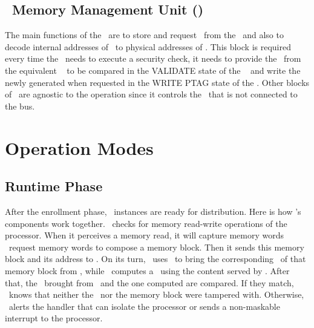 \subsection{\ptag~Memory Management Unit (\pmmu)}
\label{subsec:pmmu}
The main functions of the \pmmu~are to store and request \ptags~from the \ptagmem~and also to decode internal addresses of \ptags~to physical addresses of \ptagmem. This block is required every time the \handler~needs to execute a security check, it needs to provide the \ptag ~from the equivalent \slines~ to be compared in the VALIDATE state of the \seceng~ and write the newly generated \ptags when requested in the WRITE PTAG state of the \seceng.  Other blocks of \cshia~are agnostic to the \pmmu operation since it controls the \ptagmem~that is not connected to the bus.


\section{Operation Modes}
\label{sec:opmodes}



\subsection{Runtime Phase}
\label{subsec:runtimephase}
\def\fenroll{Figure \ref{fig:fuzzy-extractor} \subref{fig:fuzzy-enroll}}
\def\fregen{Figure \ref{fig:fuzzy-extractor} \subref{fig:fuzzy-regen}}
After the enrollment phase, \cshia~instances are ready for distribution. Here is how \cshia's components work together. \handler~checks for memory read-write operations of the processor. When it perceives a memory read, it will capture memory words \andor~request memory words to compose a memory block. Then it sends this memory block and its address to \seceng. On its turn, \seceng~uses \pmmu~to bring the corresponding \ptag~of that memory block from \ptagmem, while \ptaggen~computes a \ptag~using the content served by \handler. After that, the \ptag~brought from \ptagmem~and the one computed are compared. If they match, \seceng~knows that neither the \ptag~nor the memory block were tampered with. Otherwise, \seceng~alerts the handler that can isolate the processor or sends a non-maskable interrupt to the processor.


